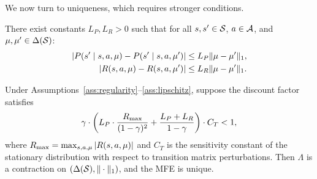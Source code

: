 \documentclass[11pt,a4paper]{article}
\begin{document}
We now turn to uniqueness, which requires stronger conditions.

\begin{assumption}
\label{ass:lipschitz}
There exist constants $L_P, L_R > 0$ such that for all
$s, s' \in \mathcal{S}$, $a \in \mathcal{A}$, and $\mu, \mu'
\in \Delta(\mathcal{S})$:
\begin{align*}
  |P(s' \mid s, a, \mu) - P(s' \mid s, a, \mu')|
  &\leq L_P \|\mu - \mu'\|_1, \\
  |R(s, a, \mu) - R(s, a, \mu')|
  &\leq L_R \|\mu - \mu'\|_1.
\end{align*}
\end{assumption}

\begin{theorem}
\label{thm:uniqueness}
Under Assumptions~\ref{ass:regularity}--\ref{ass:lipschitz},
suppose the discount factor satisfies
\begin{equation}
\label{eq:uniqueness-condition}
  \gamma \cdot \left(
    L_P \cdot \frac{R_{\max}}{(1-\gamma)^2}
    + \frac{L_P + L_R}{1-\gamma}
  \right) \cdot C_T < 1,
\end{equation}
where $R_{\max} = \max_{s,a,\mu} |R(s,a,\mu)|$ and
$C_T$ is the sensitivity constant of the stationary distribution
with respect to transition matrix perturbations.  Then $\Lambda$
is a contraction on $(\Delta(\mathcal{S}), \|\cdot\|_1)$, and
the MFE is unique.
\end{theorem}
\end{document}
